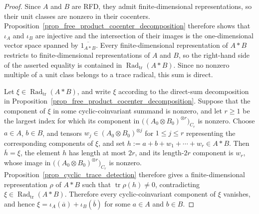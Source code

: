 \begin{proof}
    Since \(A\) and \(B\) are RFD, they admit finite-dimensional representations, so their unit classes are nonzero in their cocenters.
    Proposition~\ref{prop_free_product_cocenter_decomposition} therefore shows that \(\iota_A\) and \(\iota_B\) are injective and the intersection of their images is the one-dimensional vector space spanned by \(\overline{1_{A*B}}\).
    Every finite-dimensional representation of \(A*B\) restricts to finite-dimensional representations of \(A\) and \(B\), so the right-hand side of the asserted equality is contained in \(\operatorname{Rad}_{\mathrm{tr}}(A*B)\).
    Since no nonzero multiple of a unit class belongs to a trace radical, this sum is direct.

    Let \(\xi\in\operatorname{Rad}_{\mathrm{tr}}(A*B)\), and write \(\xi\) according to the direct-sum decomposition in Proposition~\ref{prop_free_product_cocenter_decomposition}.
    Suppose that the component of \(\xi\) in some cyclic-coinvariant summand is nonzero, and let \(r\geq1\) be the largest index for which its component in \(\bigl((A_0\otimes B_0)^{\otimes r}\bigr)_{C_r}\) is nonzero.
    Choose \(a\in A\), \(b\in B\), and tensors \(w_j\in(A_0\otimes B_0)^{\otimes j}\) for \(1\leq j\leq r\) representing the corresponding components of \(\xi\), and set \(h:=a+b+w_1+\cdots+w_r\in A*B\).
    Then \(\overline h=\xi\), the element \(h\) has length at most \(2r\), and its length-\(2r\) component is \(w_r\), whose image in \(\bigl((A_0\otimes B_0)^{\otimes r}\bigr)_{C_r}\) is nonzero.
    Proposition~\ref{prop_cyclic_trace_detection} therefore gives a finite-dimensional representation \(\rho\) of \(A*B\) such that \(\operatorname{tr}\rho(h)\neq0\), contradicting \(\xi\in\operatorname{Rad}_{\mathrm{tr}}(A*B)\).
    Therefore every cyclic-coinvariant component of \(\xi\) vanishes, and hence \(\xi=\iota_A(\overline a)+\iota_B(\overline b)\) for some \(a\in A\) and \(b\in B\).


\end{proof}
